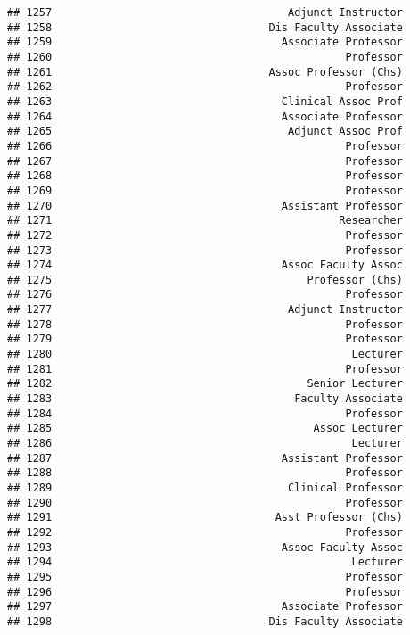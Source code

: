 \documentclass[
]{article}
\begin{document}
\begin{verbatim}
## 1257                                     Adjunct Instructor
## 1258                                  Dis Faculty Associate
## 1259                                    Associate Professor
## 1260                                              Professor
## 1261                                  Assoc Professor (Chs)
## 1262                                              Professor
## 1263                                    Clinical Assoc Prof
## 1264                                    Associate Professor
## 1265                                     Adjunct Assoc Prof
## 1266                                              Professor
## 1267                                              Professor
## 1268                                              Professor
## 1269                                              Professor
## 1270                                    Assistant Professor
## 1271                                             Researcher
## 1272                                              Professor
## 1273                                              Professor
## 1274                                    Assoc Faculty Assoc
## 1275                                        Professor (Chs)
## 1276                                              Professor
## 1277                                     Adjunct Instructor
## 1278                                              Professor
## 1279                                              Professor
## 1280                                               Lecturer
## 1281                                              Professor
## 1282                                        Senior Lecturer
## 1283                                      Faculty Associate
## 1284                                              Professor
## 1285                                         Assoc Lecturer
## 1286                                               Lecturer
## 1287                                    Assistant Professor
## 1288                                              Professor
## 1289                                     Clinical Professor
## 1290                                              Professor
## 1291                                   Asst Professor (Chs)
## 1292                                              Professor
## 1293                                    Assoc Faculty Assoc
## 1294                                               Lecturer
## 1295                                              Professor
## 1296                                              Professor
## 1297                                    Associate Professor
## 1298                                  Dis Faculty Associate

\end{verbatim}
\end{document}
